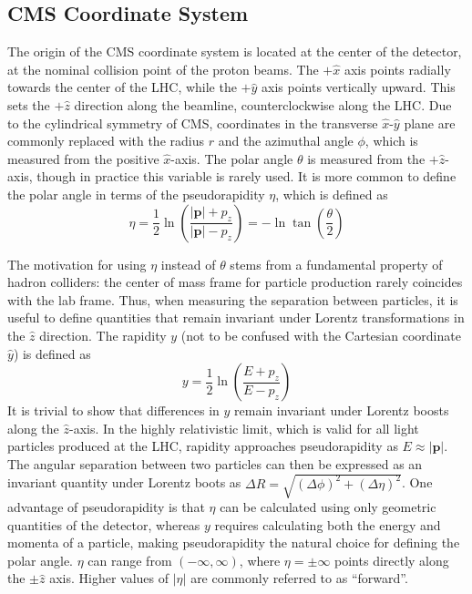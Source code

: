 \subsection{CMS Coordinate System} \label{sec:CMS_coord}
The origin of the CMS coordinate system is located at the center of the detector, at the nominal collision point of the proton beams. The $+\hat{x}$ axis points radially towards the center of the LHC, while the $+\hat{y}$ axis points vertically upward. This sets the $+\hat{z}$ direction along the beamline, counterclockwise along the LHC. Due to the cylindrical symmetry of CMS, coordinates in the transverse $\hat{x}$-$\hat{y}$ plane are commonly replaced with the radius $r$ and the azimuthal angle $\phi$, which is measured from the positive $\hat{x}$-axis. The polar angle $\theta$ is measured from the $+\hat{z}$-axis, though in practice this variable is rarely used. It is more common to define the polar angle in terms of the pseudorapidity $\eta$, which is defined as
\begin{equation}
	\eta=\frac{1}{2}\ln\left(\frac{|\mathbf{p}|+p_{z}}{|\mathbf{p}|-p_{z}}\right)=-\ln{\tan\left(\frac{\theta}{2}\right)}
\end{equation}
 
The motivation for using $\eta$ instead of $\theta$ stems from a fundamental property of hadron colliders: the center of mass frame for particle production rarely coincides with the lab frame. Thus, when measuring the separation between particles, it is useful to define quantities that remain invariant under Lorentz transformations in the $\hat{z}$ direction. The rapidity $y$ (not to be confused with the Cartesian coordinate $\hat{y}$) is defined as
\begin{equation}
	y=\frac{1}{2}\ln\left(\frac{E+p_{z}}{E-p_{z}}\right)
\end{equation}
It is trivial to show that differences in $y$ remain invariant under Lorentz boosts along the $\hat{z}$-axis. In the highly relativistic limit, which is valid for all light particles produced at the LHC, rapidity approaches pseudorapidity as $E\approx|\mathbf{p}|$. The angular separation between two particles can then be expressed as an invariant quantity under Lorentz boots as $\Delta R=\sqrt{\left(\Delta\phi\right)^2+\left(\Delta\eta\right)^2}$. One advantage of pseudorapidity is that $\eta$ can be calculated using only geometric quantities of the detector, whereas $y$ requires calculating both the energy and momenta of a particle, making pseudorapidity the natural choice for defining the polar angle. $\eta$ can range from $\left(-\infty, \infty\right)$, where $\eta=\pm\infty$ points directly along the $\pm\hat{z}$ axis. Higher values of $\left|\eta\right|$ are commonly referred to as ``forward''.

